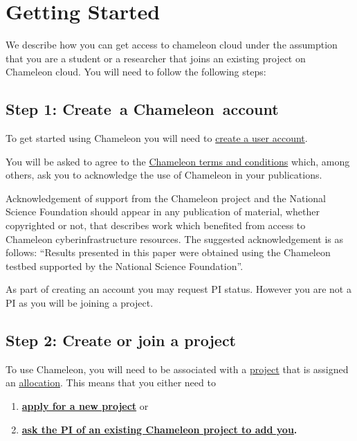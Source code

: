 
\chapter{Getting Started}
\label{C:cc-start}

\FILENAME

We describe how you can get access to chameleon cloud under the
assumption that you are a student or a researcher that joins an
existing project on Chameleon cloud. You will need to follow the
following steps:

\section*{Step 1: Create~a Chameleon~account}

To get started using Chameleon you will need to
\href{https://www.chameleoncloud.org/register}{create a user account}.

You will be asked to agree to the
\href{https://www.chameleoncloud.org/terms/view/chameleon-user-terms/}{Chameleon
  terms and conditions} which, among others, ask you to acknowledge
the use of Chameleon in your publications. 

Acknowledgement of support from the Chameleon project and the
National Science Foundation should appear in any publication of
material, whether copyrighted or not, that describes work which
benefited from access to Chameleon cyberinfrastructure resources. The
suggested acknowledgement is as follows: ``Results presented in this
paper were obtained using the Chameleon testbed supported by the
National Science Foundation''.

\begin{IU}
  As part of creating an account you may request PI status. However
  you are not a PI as you will be joining a project.
\end{IU}

\section*{Step 2: Create or join a project}

To use Chameleon, you will need to be associated with a
\href{https://www.chameleoncloud.org/docs/user-faq/\#toc-how-do-i-apply-for-a-chameleon-project-}{project}
that is assigned an
\href{https://www.chameleoncloud.org/docs/user-faq/\#toc-what-are-the-project-allocation-sizes-and-limits-}{allocation}.
This means that you either need to

\begin{enumerate}

\item \textbf{\href{https://www.chameleoncloud.org/user/projects/new/}{apply
for a new project}} or 

\item
\textbf{\href{https://www.chameleoncloud.org/docs/user-faq/\#toc-my-pi-professor-colleague-already-has-a-chameleon-project-how-do-i-get-added-as-a-user-on-the-project-}{ask
the PI of an existing Chameleon project to add you}.}

\end{enumerate}

